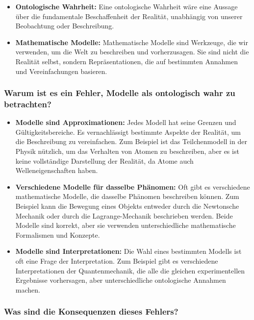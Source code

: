 \documentclass{article}
\begin{document}
\begin{itemize}
	\item \textbf{Ontologische Wahrheit:} Eine ontologische Wahrheit wäre eine Aussage über die fundamentale Beschaffenheit der Realität, unabhängig von unserer Beobachtung oder Beschreibung.
	\item \textbf{Mathematische Modelle:} Mathematische Modelle sind Werkzeuge, die wir verwenden, um die Welt zu beschreiben und vorherzusagen. Sie sind nicht die Realität selbst, sondern Repräsentationen, die auf bestimmten Annahmen und Vereinfachungen basieren.
\end{itemize}

\subsubsection{Warum ist es ein Fehler, Modelle als ontologisch wahr zu betrachten?}

\begin{itemize}
	\item \textbf{Modelle sind Approximationen:} Jedes Modell hat seine Grenzen und Gültigkeitsbereiche. Es vernachlässigt bestimmte Aspekte der Realität, um die Beschreibung zu vereinfachen. Zum Beispiel ist das Teilchenmodell in der Physik nützlich, um das Verhalten von Atomen zu beschreiben, aber es ist keine vollständige Darstellung der Realität, da Atome auch Welleneigenschaften haben.
	\item \textbf{Verschiedene Modelle für dasselbe Phänomen:} Oft gibt es verschiedene mathematische Modelle, die dasselbe Phänomen beschreiben können. Zum Beispiel kann die Bewegung eines Objekts entweder durch die Newtonsche Mechanik oder durch die Lagrange-Mechanik beschrieben werden. Beide Modelle sind korrekt, aber sie verwenden unterschiedliche mathematische Formalismen und Konzepte.
	\item \textbf{Modelle sind Interpretationen:} Die Wahl eines bestimmten Modells ist oft eine Frage der Interpretation. Zum Beispiel gibt es verschiedene Interpretationen der Quantenmechanik, die alle die gleichen experimentellen Ergebnisse vorhersagen, aber unterschiedliche ontologische Annahmen machen.
\end{itemize}

\subsubsection{Was sind die Konsequenzen dieses Fehlers?}
\end{document}
